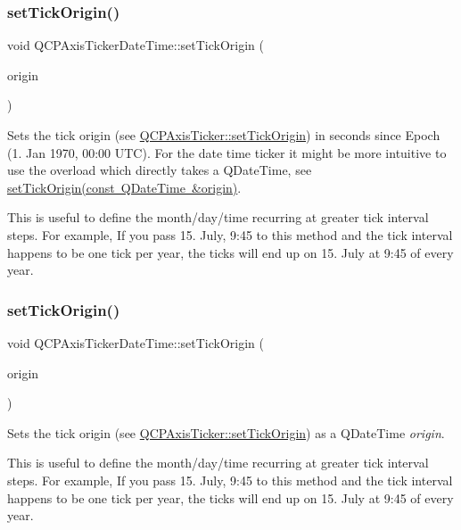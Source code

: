 \subsubsection{\texorpdfstring{setTickOrigin()}{setTickOrigin()}\hspace{0.1cm}{\footnotesize\ttfamily [1/2]}}
{\footnotesize\ttfamily void Q\+C\+P\+Axis\+Ticker\+Date\+Time\+::set\+Tick\+Origin (\begin{DoxyParamCaption}\item[{double}]{origin }\end{DoxyParamCaption})}

Sets the tick origin (see \mbox{\hyperlink{class_q_c_p_axis_ticker_ab509c7e500293bf66a8409f0d7c23943}{Q\+C\+P\+Axis\+Ticker\+::set\+Tick\+Origin}}) in seconds since Epoch (1. Jan 1970, 00\+:00 U\+TC). For the date time ticker it might be more intuitive to use the overload which directly takes a Q\+Date\+Time, see \mbox{\hyperlink{class_q_c_p_axis_ticker_date_time_a2ea905872b8171847a49a5e093fb0c48}{set\+Tick\+Origin(const Q\+Date\+Time \&origin)}}.

This is useful to define the month/day/time recurring at greater tick interval steps. For example, If you pass 15. July, 9\+:45 to this method and the tick interval happens to be one tick per year, the ticks will end up on 15. July at 9\+:45 of every year. \mbox{\label{class_q_c_p_axis_ticker_date_time_a2ea905872b8171847a49a5e093fb0c48}} 
\subsubsection{\texorpdfstring{setTickOrigin()}{setTickOrigin()}\hspace{0.1cm}{\footnotesize\ttfamily [2/2]}}
{\footnotesize\ttfamily void Q\+C\+P\+Axis\+Ticker\+Date\+Time\+::set\+Tick\+Origin (\begin{DoxyParamCaption}\item[{const Q\+Date\+Time \&}]{origin }\end{DoxyParamCaption})}

Sets the tick origin (see \mbox{\hyperlink{class_q_c_p_axis_ticker_ab509c7e500293bf66a8409f0d7c23943}{Q\+C\+P\+Axis\+Ticker\+::set\+Tick\+Origin}}) as a Q\+Date\+Time {\itshape origin}.

This is useful to define the month/day/time recurring at greater tick interval steps. For example, If you pass 15. July, 9\+:45 to this method and the tick interval happens to be one tick per year, the ticks will end up on 15. July at 9\+:45 of every year. 

